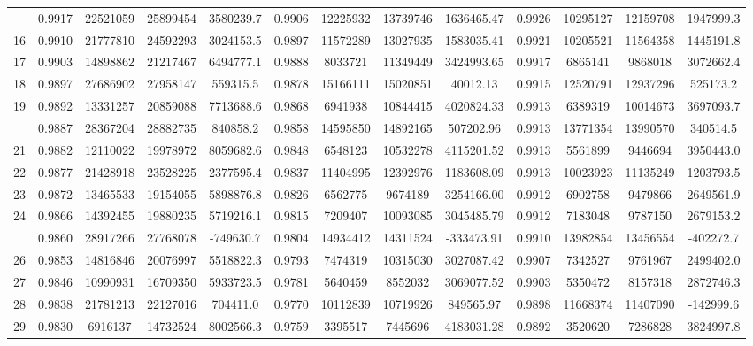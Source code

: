 \documentclass[
  12pt,
]{article}
\begin{document}
\begin{longtable}[t]{lcccccccccccc}
\addlinespace
15 & 0.9917 & 22521059 & 25899454 & 3580239.7 & 0.9906 & 12225932 & 13739746 & 1636465.47 & 0.9926 & 10295127 & 12159708 & 1947999.3\\
16 & 0.9910 & 21777810 & 24592293 & 3024153.5 & 0.9897 & 11572289 & 13027935 & 1583035.41 & 0.9921 & 10205521 & 11564358 & 1445191.8\\
17 & 0.9903 & 14898862 & 21217467 & 6494777.1 & 0.9888 & 8033721 & 11349449 & 3424993.65 & 0.9917 & 6865141 & 9868018 & 3072662.4\\
18 & 0.9897 & 27686902 & 27958147 & 559315.5 & 0.9878 & 15166111 & 15020851 & 40012.13 & 0.9915 & 12520791 & 12937296 & 525173.2\\
19 & 0.9892 & 13331257 & 20859088 & 7713688.6 & 0.9868 & 6941938 & 10844415 & 4020824.33 & 0.9913 & 6389319 & 10014673 & 3697093.7\\
\addlinespace
20 & 0.9887 & 28367204 & 28882735 & 840858.2 & 0.9858 & 14595850 & 14892165 & 507202.96 & 0.9913 & 13771354 & 13990570 & 340514.5\\
21 & 0.9882 & 12110022 & 19978972 & 8059682.6 & 0.9848 & 6548123 & 10532278 & 4115201.52 & 0.9913 & 5561899 & 9446694 & 3950443.0\\
22 & 0.9877 & 21428918 & 23528225 & 2377595.4 & 0.9837 & 11404995 & 12392976 & 1183608.09 & 0.9913 & 10023923 & 11135249 & 1203793.5\\
23 & 0.9872 & 13465533 & 19154055 & 5898876.8 & 0.9826 & 6562775 & 9674189 & 3254166.00 & 0.9912 & 6902758 & 9479866 & 2649561.9\\
24 & 0.9866 & 14392455 & 19880235 & 5719216.1 & 0.9815 & 7209407 & 10093085 & 3045485.79 & 0.9912 & 7183048 & 9787150 & 2679153.2\\
\addlinespace
25 & 0.9860 & 28917266 & 27768078 & -749630.7 & 0.9804 & 14934412 & 14311524 & -333473.91 & 0.9910 & 13982854 & 13456554 & -402272.7\\
26 & 0.9853 & 14816846 & 20076997 & 5518822.3 & 0.9793 & 7474319 & 10315030 & 3027087.42 & 0.9907 & 7342527 & 9761967 & 2499402.0\\
27 & 0.9846 & 10990931 & 16709350 & 5933723.5 & 0.9781 & 5640459 & 8552032 & 3069077.52 & 0.9903 & 5350472 & 8157318 & 2872746.3\\
28 & 0.9838 & 21781213 & 22127016 & 704411.0 & 0.9770 & 10112839 & 10719926 & 849565.97 & 0.9898 & 11668374 & 11407090 & -142999.6\\
29 & 0.9830 & 6916137 & 14732524 & 8002566.3 & 0.9759 & 3395517 & 7445696 & 4183031.28 & 0.9892 & 3520620 & 7286828 & 3824997.8\\

\end{longtable}
\end{document}

